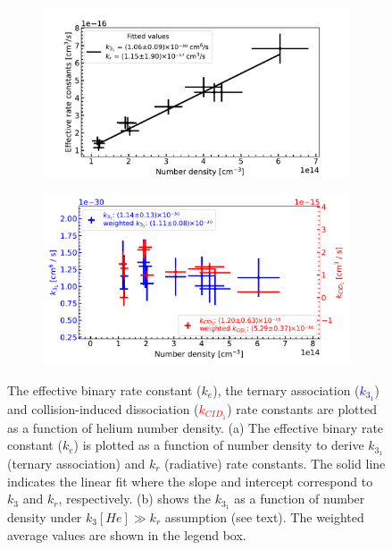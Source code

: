 \begin{figure}[!htb]
    \centering
    \begin{subfigure}[b]{0.49\textwidth}
        \centering
        \includegraphics[width=1\textwidth]{figures/measurements/kinetics/functionOf_nHe/off_4.8K_k31_effective_rate_constants.pdf}
        
        \caption{}
        \label{fig:off:effective-rate-constants}
    \end{subfigure}
    \hfill
    \begin{subfigure}[b]{0.49\textwidth}
        \centering
        \includegraphics[width=1\textwidth]{figures/measurements/kinetics/functionOf_nHe/off_4.8K_k3_kCID_1_as_functionOfnHe.pdf}
        \caption{}
        \label{fig:off:rate-constants}
    \end{subfigure}
    
    \caption{The effective binary rate constant ($k_e$), the ternary association (\textcolor{blue}{$k_{3_1}$}) and collision-induced dissociation (\textcolor{red}{$k_{CID_1}$}) rate constants are plotted as a function of helium number density. (a) The effective binary rate constant ($k_e$) is plotted as a function of number density to derive $k_{3_1}$ (ternary association) and $k_r$ (radiative) rate constants. The solid line indicates the linear fit where the slope and intercept correspond to $k_3$ and $k_r$, respectively. (b) shows the $k_{3_1}$ as a function of number density under $k_3[He] \gg k_r$ assumption (see text). The weighted average values are shown in the legend box.}

\end{figure}
